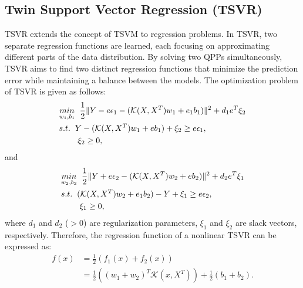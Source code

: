 \subsection{Twin Support Vector Regression (TSVR)}
TSVR extends the concept of TSVM to regression problems. In TSVR, two separate regression functions are learned, each focusing on approximating different parts of the data distribution. By solving two QPPs simultaneously, TSVR aims to find two distinct regression functions that minimize the prediction error while maintaining a balance between the models. The optimization problem of TSVR is given as follows:
\begin{align}
\label{eq:5}
      & \underset{w_1,b_1}{min} \hspace{0.2cm} \frac{1}{2} \|Y - e\epsilon_1 - (\mathcal{K}(X, X^T)w_1 + e_1b_1)\|^2 + d_1e^T\xi_2 \nonumber \\
     & s.t. \hspace{0.2cm} Y-(\mathcal{K}(X, X^T)w_1 + eb_1) + \xi_2 \geq e \epsilon_1, \nonumber \\
     & \hspace{0.8cm} \xi_2 \geq 0,
\end{align}
and
\begin{align}
\label{eq:6}
    & \underset{w_2,b_2}{min} \hspace{0.2cm} \frac{1}{2} \|Y + e\epsilon_2 - (\mathcal{K}(X, X^T)w_2 + eb_2)\|^2 + d_2e^T\xi_1 \nonumber \\
     & s.t. \hspace{0.2cm} (\mathcal{K}(X, X^T)w_2 + e_1b_2) - Y + \xi_1 \geq e\epsilon_2, \nonumber \\
     & \hspace{0.8cm} \xi_1 \geq 0,
\end{align}
where \( d_1 \) and \( d_2 \) (\( > 0 \)) are regularization parameters, $\xi_1$ and $\xi_2$ are slack vectors, respectively. Therefore, the regression function of a nonlinear TSVR can be expressed as:
\begin{align}
\label{eq:7}
    f(x) &= \frac{1}{2}(f_1(x) + f_2(x)) \nonumber \\
   & = \frac{1}{2}((w_1+w_2)^T\mathcal{K}(x, X^T)) +\frac{1}{2}(b_1 + b_2).
\end{align}
